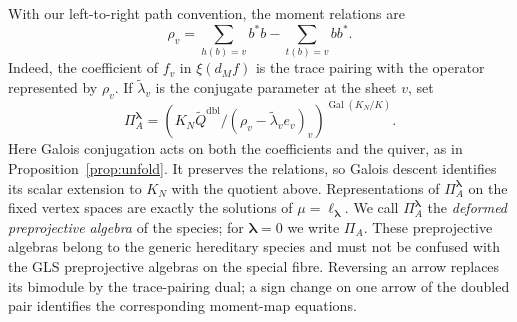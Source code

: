 \documentclass[11pt, reqno]{amsart}
\numberwithin{equation}{section}
\theoremstyle{definition}
\theoremstyle{remark}
\newcommand{\op}[1]{\operatorname{#1}}
\newcommand{\mr}[1]{\mathrm{#1}}
\newcommand{\Gal}{\op{Gal}}
\newcommand{\Qbar}{\widetilde Q}
\begin{document}
With our left-to-right path convention,
the moment relations are
\[ \rho_v=\sum_{h(b)=v}b^*b-\sum_{t(b)=v}bb^*. \]
Indeed, the coefficient of $f_v$ in $\xi(d_Mf)$ is the trace
pairing with the operator represented by $\rho_v$. If
$\widetilde\lambda_v$ is the conjugate parameter at the sheet $v$,
set
\[ \Pi_A^{\boldsymbol\lambda} =\left(K_N\Qbar^{\mr{dbl}}/ (\rho_v-\widetilde\lambda_v e_v)_v\right)^{\Gal(K_N/K)}. \]
Here Galois conjugation acts on both the coefficients and the quiver, as in
Proposition~\ref{prop:unfold}. It preserves the relations, so Galois
descent identifies its scalar extension to $K_N$ with the quotient above.
Representations of $\Pi_A^{\boldsymbol\lambda}$ on the fixed vertex
spaces are exactly the solutions of $\mu=\ell_{\boldsymbol\lambda}$.
We call $\Pi_A^{\boldsymbol\lambda}$ the
\emph{deformed preprojective algebra} of the species; for
$\boldsymbol\lambda=0$ we write $\Pi_A$.
These preprojective algebras belong to the generic hereditary species
and must not be confused with the GLS preprojective algebras on the
special fibre.
Reversing an arrow replaces its bimodule by the trace-pairing dual;
a sign change on one arrow of the doubled pair identifies the
corresponding moment-map equations.
\end{document}
